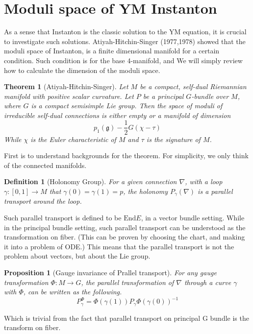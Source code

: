 \documentclass{article}
\newtheorem{defn}{Definition}
\newtheorem{thm}{Theorem}
\newtheorem{prop}{Proposition}
\begin{document}
\section*{Moduli space of YM Instanton}
As a sense that Instanton is the classic solution to the YM equation, it is crucial to investigate such solutions. Atiyah-Hitchin-Singer (1977,1978) showed that the moduli space of Instanton, is a finite dimensional manifold for a certain condition. Such condition is for the base 4-manifold, and We will simply review how to calculate the dimension of the moduli space.

\begin{thm}[Atiyah-Hitchin-Singer]
    Let $M$ be a compact, self-dual Riemannian manifold with positive scalar curvature. Let $P$ be a principal $G$-bundle over $M$, where $G$ is a compact semisimple Lie group. Then the space of moduli of irreducible self-dual connections is either empty or a manifold of dimension 
    \[
        p_1(\mathfrak{g})-\frac{1}{2}G(\chi-\tau)
    \]
    While $\chi$ is the Euler characteristic of $M$ and $\tau$ is the signature of $M$. 
\end{thm}

First is to understand backgrounds for the theorem. For simplicity, we only think of the connected manifolds.

\begin{defn}[Holonomy Group]
    For a given connection $\nabla$, with a loop $\gamma:[0,1]\rightarrow M$ that $\gamma(0)=\gamma(1)=p$, the holonomy $P_\gamma(\nabla)$ is a parallel transport around the loop. 
\end{defn}

Such parallel transport is defined to be $\mathrm{End}E$, in a vector bundle setting. While in the principal bundle setting, such parallel transport can be understood as the transformation on fiber. (This can be proven by choosing the chart, and making it into a problem of ODE.) This means that the parallel transport is not the problem about vectors, but about the Lie group. 

\begin{prop}[Gauge invariance of Prallel transport]
    For any gauge transformation $\Phi:M\rightarrow G$, the parallel transformation of $\nabla$ through a curve $\gamma$ with $\Phi$, can be written as the following.
    \[
        P^{\Phi}_\gamma = \Phi(\gamma(1)) P_\gamma \Phi(\gamma(0))^{-1}
    \]
\end{prop}

Which is trivial from the fact that parallel transport on principal G bundle is the transform on fiber. 
\end{document}
